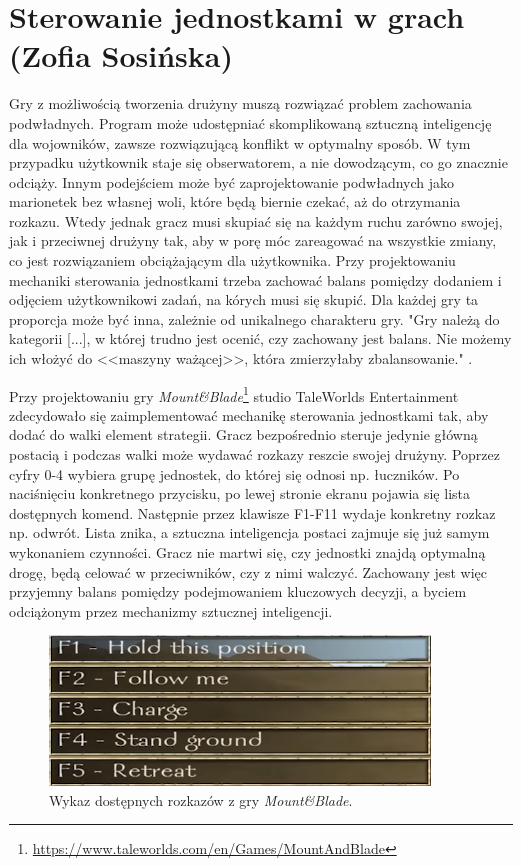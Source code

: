 \section{Sterowanie jednostkami w grach (Zofia Sosińska)}\label{chap:mb}
Gry z możliwością tworzenia drużyny muszą rozwiązać problem zachowania podwładnych. Program może udostępniać
skomplikowaną sztuczną inteligencję dla wojowników, zawsze rozwiązującą konflikt w optymalny sposób. W tym przypadku
użytkownik staje się obserwatorem, a nie dowodzącym, co go znacznie odciąży. Innym podejściem może być zaprojektowanie podwładnych jako 
marionetek bez własnej woli, które będą biernie czekać, aż do otrzymania rozkazu. Wtedy jednak gracz musi skupiać się na 
każdym ruchu zarówno swojej, jak i przeciwnej drużyny tak, aby w porę móc zareagować na wszystkie zmiany, co
jest rozwiązaniem obciążającym dla użytkownika. Przy projektowaniu mechaniki sterowania jednostkami trzeba zachować balans pomiędzy 
dodaniem i odjęciem użytkownikowi zadań, na kórych musi się skupić. Dla każdej gry ta proporcja może być inna, zależnie
od unikalnego charakteru gry. "Gry należą do kategorii [...], w której trudno jest ocenić, czy zachowany jest balans.
 Nie możemy ich włożyć do <<maszyny ważącej>>, która zmierzyłaby zbalansowanie." \cite{balancing_game}.

Przy projektowaniu gry \textit{Mount\&Blade}\footnote{\url{https://www.taleworlds.com/en/Games/MountAndBlade}} studio TaleWorlds Entertainment zdecydowało się zaimplementować mechanikę sterowania jednostkami tak, aby
dodać do walki element strategii. Gracz bezpośrednio steruje jedynie główną postacią i podczas walki może wydawać rozkazy reszcie swojej drużyny. Poprzez
cyfry 0-4 wybiera grupę jednostek, do której się odnosi np. łuczników. Po naciśnięciu konkretnego przycisku, po lewej stronie ekranu pojawia się lista dostępnych komend.
Następnie przez klawisze F1-F11 wydaje konkretny rozkaz np. odwrót. Lista znika, a sztuczna inteligencja postaci zajmuje się już samym wykonaniem czynności.
Gracz nie martwi się, czy jednostki znajdą optymalną drogę, 
będą celować w przeciwników, czy z nimi walczyć. Zachowany jest więc przyjemny balans pomiędzy podejmowaniem kluczowych decyzji, a byciem odciążonym przez mechanizmy sztucznej inteligencji.

\begin{figure}[h!tbp]
    \centering
    \includegraphics[width=0.9\textwidth]{images/ui/commandsMountBla.png}
    \caption{Wykaz dostępnych rozkazów z gry \textit{Mount\&Blade}.}\label{fig:MountnBlade}
    \label{fig:mnb}
\end{figure}
